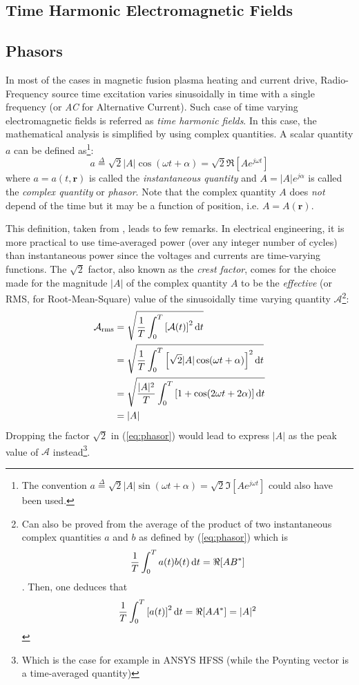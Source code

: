\subsection{Time Harmonic Electromagnetic Fields}
\subsection{Phasors}
In most of the cases in magnetic fusion plasma heating and current drive, Radio-Frequency source time excitation varies sinusoidally in time with a single frequency (or \emph{AC} for Alternative Current). Such case of time varying electromagnetic fields is referred as \emph{time harmonic fields}. In this case, the mathematical analysis is simplified by using complex quantities. A scalar quantity $a$ can be defined as\footnote{The convention $ a \stackrel{\Delta}{=} \sqrt{2} |A| \sin (\omega t + \alpha) = \sqrt{2} \Im\left[A e^{j \omega t} \right]$ could also have been used.}:
\begin{equation}
 a \stackrel{\Delta}{=} \sqrt{2} |A| \cos (\omega t + \alpha) = \sqrt{2} \Re\left[A e^{j \omega t} \right] \label{eq:phasor}
\end{equation}
where $a=a(t,\mathbf{r})$ is called the \emph{instantaneous quantity} and $A=|A|e^{j\alpha}$ is called the \emph{complex quantity} or \emph{phasor}. Note that the complex quantity $A$ does \emph{not} depend of the time but it may be a function of position, i.e. $A=A(\mathbf{r})$. 

This definition, taken from \parencite{Harrington2001}, leads to few remarks. In electrical engineering, it is more practical to use time-averaged power (over any integer number of cycles) than instantaneous power since the voltages and currents are time-varying functions. The $\sqrt{2}$ factor, also known as the \emph{crest factor}, comes for the choice made for the magnitude $|A|$ of the complex quantity $A$ to be the \emph{effective} (or RMS, for Root-Mean-Square) value of the sinusoidally time varying quantity $\mathcal{A}$\footnote{Can also be proved from the average of the product of two instantaneous complex quantities $a$ and $b$ as defined by (\ref{eq:phasor}) which is  
$$ 
\frac{1}{T}  \int_0^T a(t) b(t)\mathop{}\!\mathrm{d} t = \Re[AB^*]
$$. Then, one deduces that 
$$
\frac{1}{T}  \int_0^T \left[a(t)\right]^2 \mathop{}\!\mathrm{d} t = \Re[AA^*] = |A|^2
$$}: 
\begin{subequations}
 \begin{align}
  \mathcal{A}_{\mathrm{rms}}
    &= \sqrt{\frac{1}{T} \int_0^T \left[\mathcal{A}(t) \right]^2 \mathop{}\!\mathrm{d} t}  \nonumber \\
    &= \sqrt{\frac{1}{T} \int_0^T  \left[\sqrt{2} |A| \cos (\omega t + \alpha) \right]^2 \mathop{}\!\mathrm{d} t} \nonumber \\
    &= \sqrt{\frac{|A|^2}{T} \int_0^T  \left[ 1+\cos (2\omega t + 2\alpha) \right] \mathop{}\!\mathrm{d} t} \nonumber \\
    &= |A| \nonumber
 \end{align}
\end{subequations}
Dropping the factor $\sqrt{2}$ in (\ref{eq:phasor}) would lead to express $|A|$ as the peak value of $\mathcal{A}$ instead\footnote{Which is the case for example in ANSYS HFSS (while the Poynting vector is a time-averaged quantity)}. 

